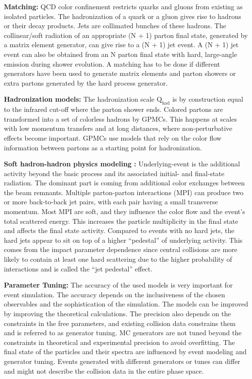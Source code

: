 \textbf{Matching:} QCD color confinement restricts quarks and gluons from existing as isolated particles. The hadronization of a quark or a gluon gives rise to hadrons or their decay products. Jets are collimated bunches of these hadrons. The collinear/soft radiation of an appropriate (N + 1) parton final state, generated by a matrix element generator, can give rise to a (N + 1) jet event. A (N + 1) jet event can also be obtained from an N parton final state with hard, large-angle emission during shower evolution. A matching has to be done if different generators have been used to generate matrix elements and parton showers or extra partons generated by the hard process generator.

\textbf{Hadronization models:} The hadronization scale $\text{Q}_{\text{had}}$ is by construction equal to the infrared cut-off where the parton shower ends. Colored partons are transformed into a set of colorless hadrons by GPMCs. This happens at scales with low momentum transfers and at long distances, where non-perturbative effects become important. GPMCs use models that rely on the color flow information between partons as a starting point for hadronization.

\textbf{Soft hadron-hadron physics modeling :} Underlying-event is the additional activity beyond the basic process and its associated initial- and final-state radiation. The dominant part is coming from additional color exchanges between the beam remnants. Multiple parton-parton interactions (MPI) can produce two or more back-to-back jet pairs, with each pair having a small transverse momentum. Most MPI are soft, and they influence the color flow and the event's total scattered energy. This increases the particle multiplicity in the final state and affects the final state activity. Compared to events with no hard jets, the hard jets appear to sit on top of a higher ``pedestal'' of underlying activity. This comes from the impact parameter dependence since central collisions are more likely to contain at least one hard scattering due to the higher probability of interactions and is called the ``jet pedestal'' effect.

\textbf{Parameter Tuning:} The accuracy of the used models is very important for event simulation. The accuracy depends on the inclusiveness of the chosen observables and the sophistication of the simulation. The models can be improved by improving the theoretical calculations. The precision also depends on the constraints in the free parameters, and existing collision data constrains them and is referred to as generator tuning. MC generators are not tuned beyond the constraints in theoretical and experimental precision to avoid overfitting. The final state of the particles and their spectra are influenced by event modeling and generator tuning. Events generated with different generators or tunes can differ and might not describe the collision data in the entire phase space.


